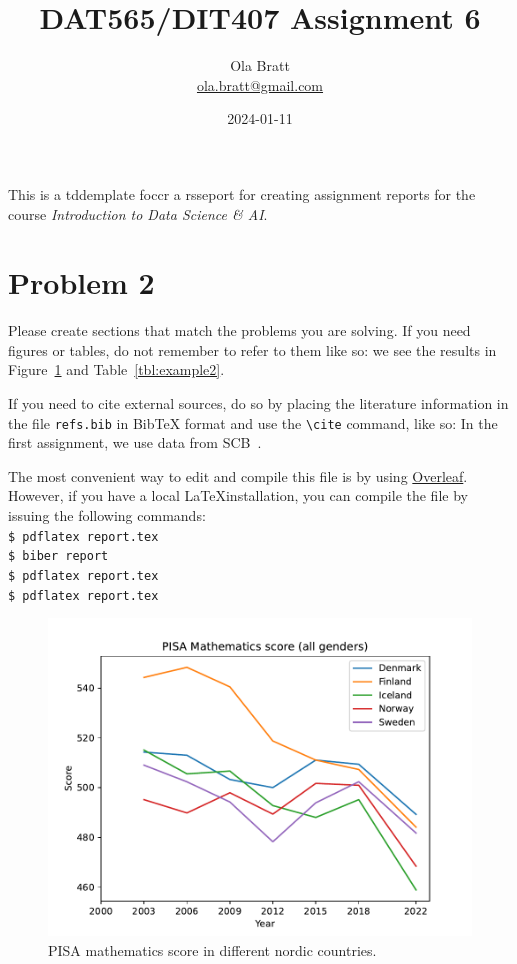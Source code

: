 \documentclass[a4paper]{article}
\begin{document}
\author{Ola Bratt \\
  \href{mailto:ola.bratt@gmail.com}{ola.bratt@gmail.com}
}
\title{DAT565/DIT407 Assignment 6}
\date{2024-01-11}

\maketitle

This is a tddemplate foccr a rsseport for creating assignment reports for
the course \emph{Introduction to Data Science \& AI}.

\section*{Problem 2}

Please create sections that match the problems you are solving. If you
need figures or tables, do not remember to refer to them like so: we
see the results in Figure~\ref{fig:example1} and
Table~\ref{tbl:example2}.

If you need to cite external sources, do so by placing the literature
information in the file \texttt{refs.bib} in BibTeX format and use the
\texttt{\textbackslash{}cite} command, like so: In the first
assignment, we use data from SCB~\cite{SCB:2023}.

The most convenient way to edit and compile this file is by using
\href{https://www.overleaf.com}{Overleaf}. However, if you have a
local \LaTeX installation, you can compile the file by issuing the
following commands:\\
\texttt{\$ pdflatex report.tex} \\
\texttt{\$ biber report} \\
\texttt{\$ pdflatex report.tex} \\
\texttt{\$ pdflatex report.tex} \\

\begin{figure}[htb]
  \begin{center}
    \includegraphics[width=\textwidth]{pisa_mathematics_in_nordic_countries.pdf}
    \caption{PISA mathematics score in different nordic countries.}
    \label{fig:example1}
  \end{center}
\end{figure}
\end{document}
